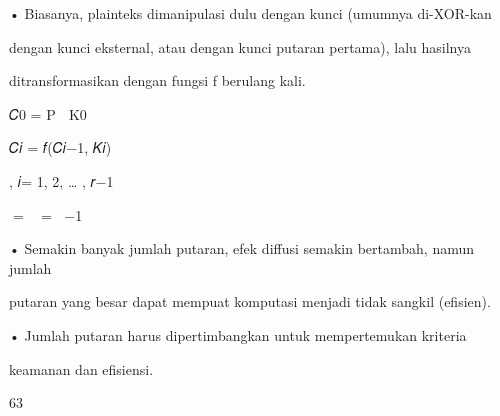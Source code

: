 \documentclass{article}
\begin{document}

• Biasanya, plainteks dimanipulasi dulu dengan kunci (umumnya di-XOR-kan 

dengan kunci eksternal, atau dengan kunci putaran pertama), lalu hasilnya 

ditransformasikan dengan fungsi f berulang kali.




          𝐶0 = P   K0 

                       𝐶𝑖 = 𝑓(𝐶𝑖−1, 𝐾𝑖) 

, 𝑖= 1, 2, … , 𝑟−1



𝐶= 𝐶𝑟 = 𝐶𝑟−1  𝐾𝑟

• Semakin banyak jumlah putaran, efek diffusi semakin bertambah, namun jumlah 

putaran yang besar dapat mempuat komputasi menjadi tidak sangkil (efisien).

• Jumlah putaran harus dipertimbangkan untuk mempertemukan kriteria 

keamanan dan efisiensi. 


63
\end{document}
